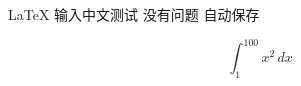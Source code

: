 \documentclass{article}
\begin{document}
\LaTeX{}
输入中文测试
没有问题
自动保存

$$
\int_{1}^{100} x^2 \,dx 
$$
\end{document}

